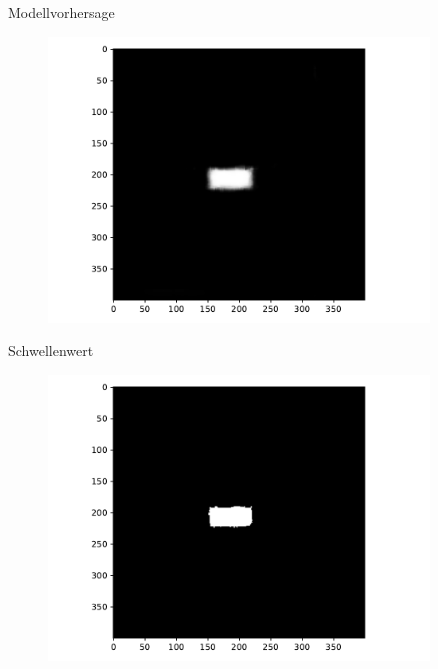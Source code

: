 \begin{frame}{Modellvorhersage}
    \begin{figure}
        \centering
        \includegraphics[width=0.9\textwidth]{img/model_demo_3}
    \end{figure}
\end{frame}

\begin{frame}{Schwellenwert}
    \begin{figure}
        \centering
        \includegraphics[width=0.9\textwidth]{img/model_demo_4}
    \end{figure}
\end{frame}

